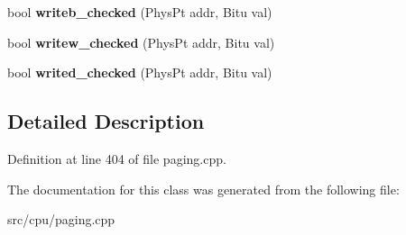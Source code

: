 \begin{DoxyCompactItemize}
\item 
\hypertarget{classExceptionPageHandler_adbf235a475734e4409d64221caeb42e0}{bool {\bfseries writeb\-\_\-checked} (Phys\-Pt addr, Bitu val)}\label{classExceptionPageHandler_adbf235a475734e4409d64221caeb42e0}

\item 
\hypertarget{classExceptionPageHandler_a13741eb7ada1e7c769e9395f827a5646}{bool {\bfseries writew\-\_\-checked} (Phys\-Pt addr, Bitu val)}\label{classExceptionPageHandler_a13741eb7ada1e7c769e9395f827a5646}

\item 
\hypertarget{classExceptionPageHandler_ae2f1819a31546b4bf7338faee9a645c4}{bool {\bfseries writed\-\_\-checked} (Phys\-Pt addr, Bitu val)}\label{classExceptionPageHandler_ae2f1819a31546b4bf7338faee9a645c4}

\end{DoxyCompactItemize}


\subsection{Detailed Description}


Definition at line 404 of file paging.\-cpp.



The documentation for this class was generated from the following file\-:\begin{DoxyCompactItemize}
\item 
src/cpu/paging.\-cpp\end{DoxyCompactItemize}
